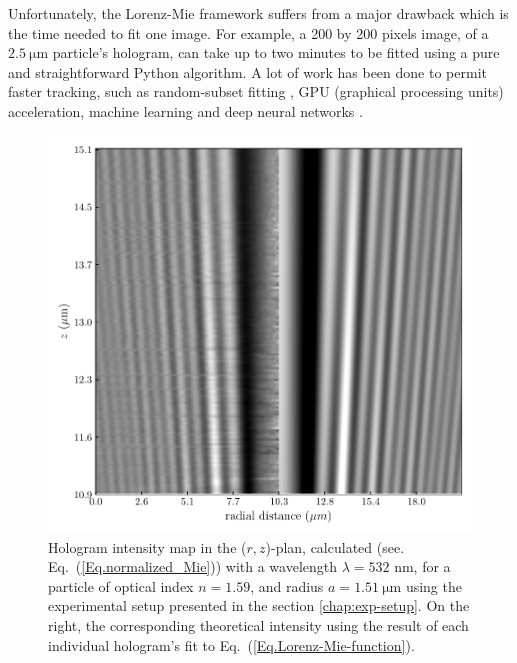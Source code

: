 Unfortunately, the Lorenz-Mie framework suffers from a major drawback which is the time needed to fit one image. For example, a 200 by 200 pixels image, of a $2.5 ~ \mathrm{\mu m}$ particle's hologram, can take up to two minutes to be fitted using a pure and straightforward Python algorithm. A lot of work has been done to permit faster tracking, such as random-subset fitting \cite{dimiduk_random-subset_2014}, GPU (graphical processing units) acceleration, machine learning \cite{yevick_machine-learning_2014, hannel_machine-learning_2018} and deep neural networks \cite{altman_catch_2020}.

\begin{figure}[H]
	\centering
	\includegraphics{02_body/chapter2/images/test_tableau2.pdf}
	\caption{Hologram intensity map in the ($r,z$)-plan, calculated (see. Eq.~(\ref{Eq.normalized_Mie})) with a wavelength $\lambda = 532$ nm, for a particle of optical index $n = 1.59$, and radius $a = 1.51 ~\mathrm{\mu m}$ using the experimental setup presented in the section \ref{chap:exp-setup}. On the right, the corresponding theoretical intensity using the result of each individual hologram's fit to Eq.~(\ref{Eq.Lorenz-Mie-function}).}
	\label{fig:holo_z_fit}
\end{figure}


